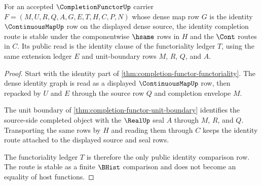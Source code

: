 \begin{theorem}
\label{thm:completion-functor-identity-route-stability}
For an accepted $\CompletionFunctorUp$ carrier $F=(M,U,R,Q,A,G,E,T,H,C,P,N)$ whose dense map row $G$ is the identity $\ContinuousMapUp$ row on the displayed dense source, the identity completion route is stable under the componentwise $\hsame$ rows in $H$ and the $\Cont$ routes in $C$. Its public read is the identity clause of the functoriality ledger $T$, using the same extension ledger $E$ and unit-boundary rows $M$, $R$, $Q$, and $A$.
\end{theorem}
\begin{proof}
Start with the identity part of \autoref{thm:completion-functor-functoriality}. The dense identity graph is read as a displayed $\ContinuousMapUp$ row, then repacked by $U$ and $E$ through the source row $Q$ and completion envelope $M$.

The unit boundary of \autoref{thm:completion-functor-unit-boundary} identifies the source-side completed object with the $\RealUp$ seal $A$ through $M$, $R$, and $Q$. Transporting the same rows by $H$ and reading them through $C$ keeps the identity route attached to the displayed source and seal rows.

The functoriality ledger $T$ is therefore the only public identity comparison row. The route is stable as a finite $\BHist$ comparison and does not become an equality of host functions.
\end{proof}

